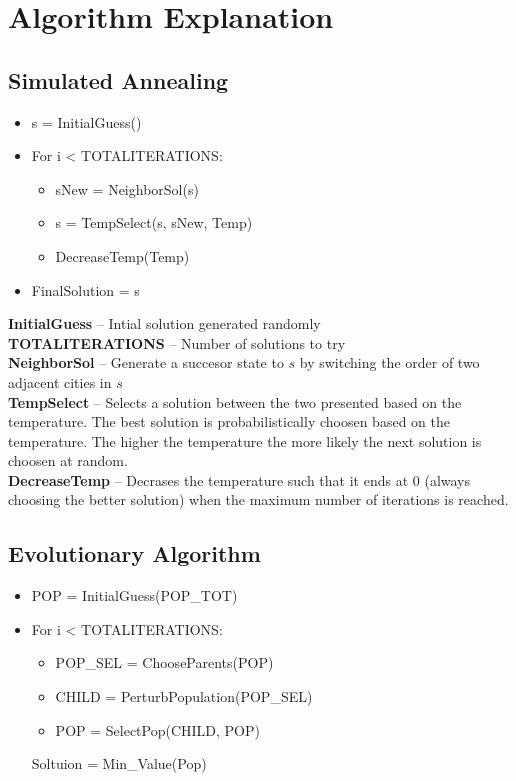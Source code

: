 




\section{Algorithm Explanation}
\subsection{Simulated Annealing}
\begin{itemize}
\item s = InitialGuess()
\item For i < TOTALITERATIONS:
	\begin{itemize}
	\item sNew = NeighborSol(s)
	\item s = TempSelect(s, sNew, Temp)
	\item DecreaseTemp(Temp)
	\end{itemize}
\item FinalSolution = s
\end{itemize}

\textbf{InitialGuess} -- Intial solution generated randomly \\
\textbf{TOTALITERATIONS} -- Number of solutions to try \\
\textbf{NeighborSol} -- Generate a succesor state to $s$ by switching the order of two adjacent cities in $s$ \\
\textbf{TempSelect} -- Selects a solution between the two presented based on the temperature.  The best solution is probabilistically choosen based on the temperature.  The higher the temperature the more likely the next solution is choosen at random. \\
\textbf{DecreaseTemp} -- Decrases the temperature such that it ends at 0 (always choosing the better solution) when the maximum number of iterations is reached. 

\subsection{Evolutionary Algorithm}
\begin{itemize}
	\item POP = InitialGuess(POP\_TOT)
	\item For i < TOTALITERATIONS:
		\begin{itemize}
			\item POP\_SEL = ChooseParents(POP)
			\item CHILD = PerturbPopulation(POP\_SEL)
			\item POP = SelectPop(CHILD, POP)
		\end{itemize}
	Soltuion = Min\_Value(Pop)
\end{itemize}

